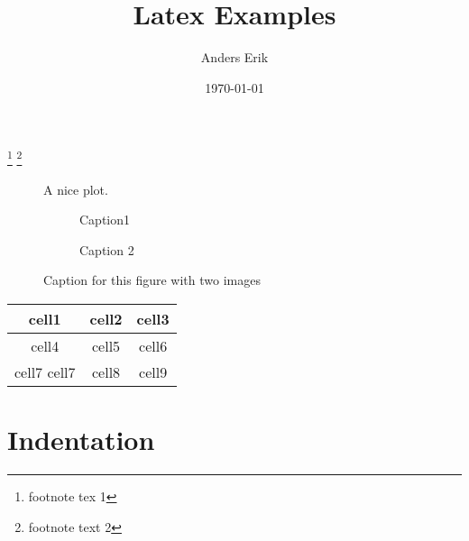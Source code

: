 \documentclass[12pt, letterpaper]{article}
\title{Latex Examples}
\author{Anders Erik}
\date{\today}
\numberwithin{equation}{section}
\begin{document}
\maketitle

\footnote [1] { footnote tex 1 } 
\footnote [4] { footnote text 2 } 


\begin{figure}[H]
    \centering
    \caption{A nice plot.}
    \label{fig:mesh1}
\end{figure}


\begin{figure}[H]

\begin{subfigure}{0.1\textwidth}
\caption{Caption1}
\label{fig:subim1}
\end{subfigure}

\begin{subfigure}{0.4\textwidth}
\caption{Caption 2}
\label{fig:subim2}
\end{subfigure}

\caption{Caption for this figure with two images}
\label{fig:image2}

\end{figure}

\begin{center}
\begin{tabular}{|| c | c | c ||}
  \hline
  cell1& cell2 & cell3 \\ 
  \hline
  cell4 & cell5 & cell6 \\ 
  \hline
  cell7 \newline cell7  & cell8 & cell9 \\ 
  \hline
\end{tabular}
\end{center}


\section*{Indentation}
\setlength{\parindent}{20pt}
\end{document}
